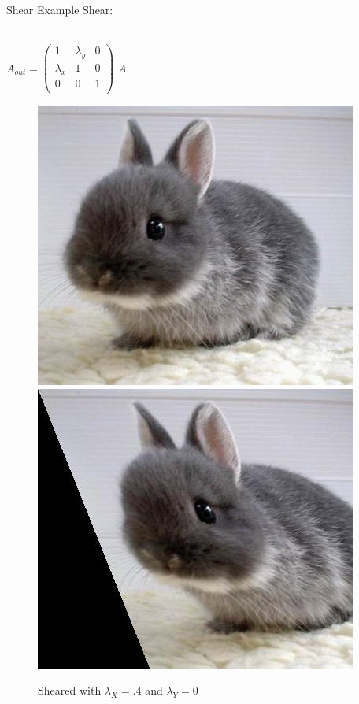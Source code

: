 \documentclass{beamer}
\begin{document}
\begin{frame}{Shear}
Example Shear:

\hspace{0.1 in}
\\
$A_{out} = \begin{pmatrix}
	1 & \lambda_y & 0\\
	\lambda_x & 1 & 0\\
	0 & 0 & 1\\
\end{pmatrix}$
$A$
\\
\begin{figure}

\includegraphics[width = 1.1 in]{bunnycute.jpg}
\hspace{0.5 in}
\includegraphics[width = 1.1 in]{bunnycuteShear.jpg}
\caption{Sheared with $\lambda_X = .4$ and $\lambda_Y = 0$}
\end{figure}

\end{frame}
\end{document}
